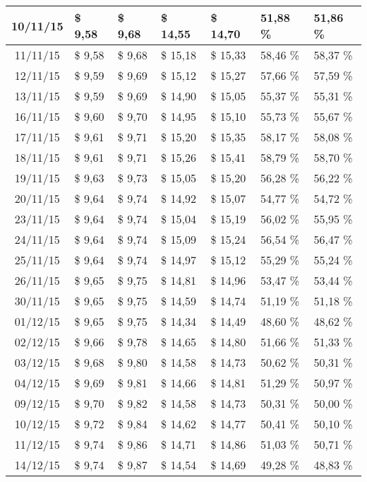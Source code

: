 \begin{center}
\begin{longtable}{|c|p{1.5cm}|p{1.5cm}|p{1.5cm}|p{1.5cm}|p{1.5cm}|p{1.5cm}|}
10/11/15 & \$ 9,58 & \$ 9,68 & \$ 14,55 & \$ 14,70 & 51,88 \% & 51,86 \% \\ \hline
11/11/15 & \$ 9,58 & \$ 9,68 & \$ 15,18 & \$ 15,33 & 58,46 \% & 58,37 \% \\ \hline
12/11/15 & \$ 9,59 & \$ 9,69 & \$ 15,12 & \$ 15,27 & 57,66 \% & 57,59 \% \\ \hline
13/11/15 & \$ 9,59 & \$ 9,69 & \$ 14,90 & \$ 15,05 & 55,37 \% & 55,31 \% \\ \hline
16/11/15 & \$ 9,60 & \$ 9,70 & \$ 14,95 & \$ 15,10 & 55,73 \% & 55,67 \% \\ \hline
17/11/15 & \$ 9,61 & \$ 9,71 & \$ 15,20 & \$ 15,35 & 58,17 \% & 58,08 \% \\ \hline
18/11/15 & \$ 9,61 & \$ 9,71 & \$ 15,26 & \$ 15,41 & 58,79 \% & 58,70 \% \\ \hline
19/11/15 & \$ 9,63 & \$ 9,73 & \$ 15,05 & \$ 15,20 & 56,28 \% & 56,22 \% \\ \hline
20/11/15 & \$ 9,64 & \$ 9,74 & \$ 14,92 & \$ 15,07 & 54,77 \% & 54,72 \% \\ \hline
23/11/15 & \$ 9,64 & \$ 9,74 & \$ 15,04 & \$ 15,19 & 56,02 \% & 55,95 \% \\ \hline
24/11/15 & \$ 9,64 & \$ 9,74 & \$ 15,09 & \$ 15,24 & 56,54 \% & 56,47 \% \\ \hline
25/11/15 & \$ 9,64 & \$ 9,74 & \$ 14,97 & \$ 15,12 & 55,29 \% & 55,24 \% \\ \hline
26/11/15 & \$ 9,65 & \$ 9,75 & \$ 14,81 & \$ 14,96 & 53,47 \% & 53,44 \% \\ \hline
30/11/15 & \$ 9,65 & \$ 9,75 & \$ 14,59 & \$ 14,74 & 51,19 \% & 51,18 \% \\ \hline
01/12/15 & \$ 9,65 & \$ 9,75 & \$ 14,34 & \$ 14,49 & 48,60 \% & 48,62 \% \\ \hline
02/12/15 & \$ 9,66 & \$ 9,78 & \$ 14,65 & \$ 14,80 & 51,66 \% & 51,33 \% \\ \hline
03/12/15 & \$ 9,68 & \$ 9,80 & \$ 14,58 & \$ 14,73 & 50,62 \% & 50,31 \% \\ \hline
04/12/15 & \$ 9,69 & \$ 9,81 & \$ 14,66 & \$ 14,81 & 51,29 \% & 50,97 \% \\ \hline
09/12/15 & \$ 9,70 & \$ 9,82 & \$ 14,58 & \$ 14,73 & 50,31 \% & 50,00 \% \\ \hline
10/12/15 & \$ 9,72 & \$ 9,84 & \$ 14,62 & \$ 14,77 & 50,41 \% & 50,10 \% \\ \hline
11/12/15 & \$ 9,74 & \$ 9,86 & \$ 14,71 & \$ 14,86 & 51,03 \% & 50,71 \% \\ \hline
14/12/15 & \$ 9,74 & \$ 9,87 & \$ 14,54 & \$ 14,69 & 49,28 \% & 48,83 \% \\ \hline

\end{longtable}
\end{center}
